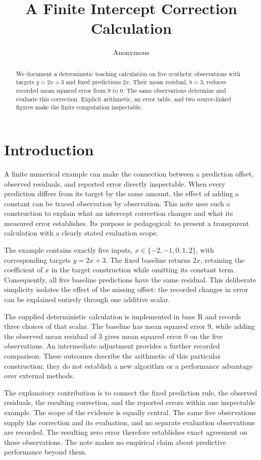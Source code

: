 \documentclass[11pt]{article}
\title{A Finite Intercept Correction Calculation}
\author{Anonymous}
\date{}
\begin{document}
\maketitle
\begin{abstract}
We document a deterministic teaching calculation on five synthetic observations with targets \(y=2x+3\) and fixed predictions \(2x\). Their mean residual, \(b=3\), reduces recorded mean squared error from \(9\) to \(0\). The same observations determine and evaluate this correction. Explicit arithmetic, an error table, and two source-linked figures make the finite computation inspectable.
\end{abstract}
\section{Introduction}
A finite numerical example can make the connection between a prediction offset, observed residuals, and reported error directly inspectable. When every prediction differs from its target by the same amount, the effect of adding a constant can be traced observation by observation. This note uses such a construction to explain what an intercept correction changes and what its measured error establishes. Its purpose is pedagogical: to present a transparent calculation with a clearly stated evaluation scope.

The example contains exactly five inputs, \(x\in\{-2,-1,0,1,2\}\), with corresponding targets \(y=2x+3\). The fixed baseline returns \(2x\), retaining the coefficient of \(x\) in the target construction while omitting its constant term. Consequently, all five baseline predictions have the same residual. This deliberate simplicity isolates the effect of the missing offset: the recorded changes in error can be explained entirely through one additive scalar.

The supplied deterministic calculation is implemented in base R and records three choices of that scalar. The baseline has mean squared error \(9\), while adding the observed mean residual of \(3\) gives mean squared error \(0\) on the five observations. An intermediate adjustment provides a further recorded comparison. These outcomes describe the arithmetic of this particular construction; they do not establish a new algorithm or a performance advantage over external methods.

The explanatory contribution is to connect the fixed prediction rule, the observed residuals, the resulting correction, and the reported errors within one inspectable example. The scope of the evidence is equally central. The same five observations supply the correction and its evaluation, and no separate evaluation observations are recorded. The resulting zero error therefore establishes exact agreement on those observations. The note makes no empirical claim about predictive performance beyond them.
\end{document}
